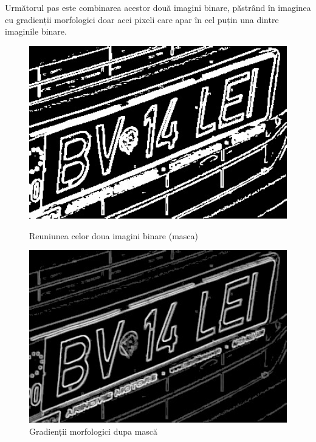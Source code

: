 \documentclass[a4paper,12pt]{report}
\begin{document}
Următorul pas este combinarea acestor două imagini binare, păstrând în imaginea cu gradienții morfologici doar acei pixeli care apar în cel puțin una dintre imaginile binare.

\begin{figure}[h!]
    \centering
    \begin{minipage}{0.4\textwidth}
        \centering
        \includegraphics[width=1\textwidth]{images/or_binary.jpg}
        \caption{Reuniunea celor doua imagini binare (masca)}
    \end{minipage}
    \hspace{0.05\textwidth}
    \begin{minipage}{0.4\textwidth}
        \centering
        \includegraphics[width=1\textwidth]{images/or_gradient.jpg}
        \caption{Gradienții morfologici dupa mască}
    \end{minipage}
\end{figure}
\FloatBarrier
\end{document}

